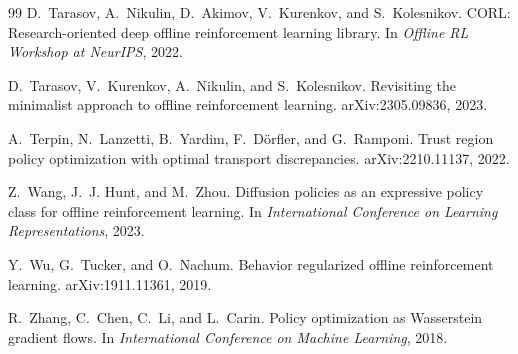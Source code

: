 \begin{thebibliography}{99}
D.~Tarasov, A.~Nikulin, D.~Akimov, V.~Kurenkov, and S.~Kolesnikov.
\newblock CORL: Research-oriented deep offline reinforcement learning library.
\newblock In \emph{Offline RL Workshop at NeurIPS}, 2022.

D.~Tarasov, V.~Kurenkov, A.~Nikulin, and S.~Kolesnikov.
\newblock Revisiting the minimalist approach to offline reinforcement learning.
\newblock arXiv:2305.09836, 2023.

A.~Terpin, N.~Lanzetti, B.~Yardim, F.~D\"orfler, and G.~Ramponi.
\newblock Trust region policy optimization with optimal transport discrepancies.
\newblock arXiv:2210.11137, 2022.

Z.~Wang, J.~J. Hunt, and M.~Zhou.
\newblock Diffusion policies as an expressive policy class for offline reinforcement learning.
\newblock In \emph{International Conference on Learning Representations}, 2023.

Y.~Wu, G.~Tucker, and O.~Nachum.
\newblock Behavior regularized offline reinforcement learning.
\newblock arXiv:1911.11361, 2019.

R.~Zhang, C.~Chen, C.~Li, and L.~Carin.
\newblock Policy optimization as Wasserstein gradient flows.
\newblock In \emph{International Conference on Machine Learning}, 2018.
\end{thebibliography}
